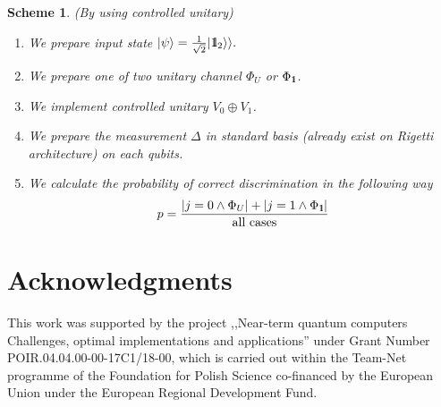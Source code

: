 \documentclass[11pt,a4paper,reqno, oneside]{amsart}
\newcommand{\ket}[1]{\ensuremath{|#1\rangle}}
\newcommand{\1}{{\rm 1\hspace{-0.9mm}l}}
\newcommand{\Id}{{\rm 1\hspace{-0.9mm}l}}
\newtheorem{scheme}{Scheme}
\begin{document}
\newpage
\begin{scheme}(By using controlled unitary)

\begin{enumerate}
\item We prepare input state $\ket{\psi} = \frac{1}{\sqrt{2} } | \Id_2 \rangle 
\rangle. $
\item We prepare one of two unitary channel $\Phi_{U} $ or $\Phi_{\1}$. 
\item We implement controlled unitary $V_0 \oplus V_1$.
\item We prepare the measurement $\Delta$ in standard basis (already exist on 
Rigetti architecture) on each qubits.
\item We calculate the probability of correct discrimination in the following 
way
\begin{equation}
p = \frac{|j=0 \wedge \Phi_{U} | + |j=1 \wedge \Phi_{\1}|}{\text{all 
cases}}
\end{equation}
\end{enumerate}
\end{scheme}
%
%
%
\section*{Acknowledgments}


This work was supported by the project ,,Near-term quantum computers Challenges, 
optimal implementations and applications'' under
Grant Number POIR.04.04.00-00-17C1/18-00, which is carried out within the 
Team-Net programme of the
Foundation for Polish Science co-financed by the European Union under the European Regional
Development Fund.





\end{document}
